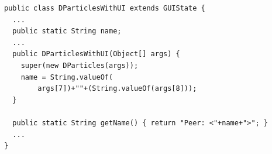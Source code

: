 \documentclass[12pt]{article}
\begin{document}
\begin{lstlisting}
public class DParticlesWithUI extends GUIState {
  ...
  public static String name;
  ...
  public DParticlesWithUI(Object[] args) {
    super(new DParticles(args));
    name = String.valueOf(
    	args[7])+""+(String.valueOf(args[8]));
  }
  
  public static String getName() { return "Peer: <"+name+">"; }
  ...
}

\end{lstlisting}
\end{document}
